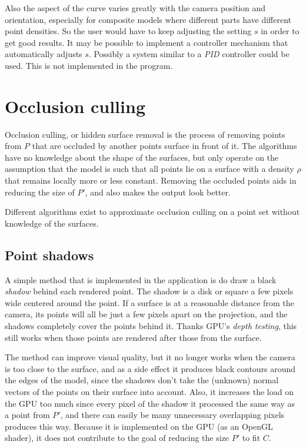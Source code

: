 \documentclass[a4paper,10pt,abstracton,notitlepage]{scrreprt}
\begin{document}
Also the aspect of the curve varies greatly with the camera position and orientation, especially for composite models where different parts have different point densities. So the user would have to keep adjusting the setting $s$ in order to get good results. It may be possible to implement a controller mechanism that automatically adjusts $s$. Possibly a system similar to a \emph{PID} controller could be used. This is not implemented in the program.




\section{Occlusion culling}
Occlusion culling, or hidden surface removal is the process of removing points from $P$ that are occluded by another points surface in front of it. The algorithms have no knowledge about the shape of the surfaces, but only operate on the assumption that the model is such that all points lie on a surface with a density $\rho$ that remains locally more or less constant. Removing the occluded points aids in reducing the size of $P'$, and also makes the output look better.

Different algorithms exist to approximate occlusion culling on a point set without knowledge of the surfaces.

\subsection{Point shadows}
A simple method that is implemented in the application is do draw a black \emph{shadow} behind each rendered point. The shadow is a disk or square a few pixels wide centered around the point. If a surface is at a reasonable distance from the camera, its points will all be just a few pixels apart on the projection, and the shadows completely cover the points behind it. Thanks GPU's \emph{depth testing}, this still works when those points are rendered after those from the surface.

The method can improve visual quality, but it no longer works when the camera is too close to the surface, and as a side effect it produces black contours around the edges of the model, since the shadows don't take the (unknown) normal vectors of the points on their surface into account. Also, it increases the load on the GPU too much since every pixel of the shadow it processed the same way as a point from $P'$, and there can easily be many unnecessary overlapping pixels produces this way. Because it is implemented on the GPU (as an OpenGL shader), it does not contribute to the goal of reducing the size $P'$ to fit $C$.
\end{document}
